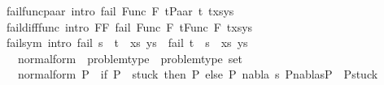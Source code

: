 \begin{isabellebody}
fail{\isacharunderscore}{\kern0pt}func{\isacharunderscore}{\kern0pt}paar\ {\isacharbrackleft}{\kern0pt}intro{\isacharbang}{\kern0pt}{\isacharbrackright}{\kern0pt}{\isacharcolon}{\kern0pt}\ {\isachardoublequoteopen}fail\ {\isacharparenleft}{\kern0pt}Func\ F\ t{\isasymapprox}{\isacharquery}{\kern0pt}Paar\ t{}\ t{}{\isacharhash}{\kern0pt}xs{\isacharcomma}{\kern0pt}ys{\isacharparenright}{\kern0pt}{\isachardoublequoteclose}\ {\isacharbar}{\kern0pt}\isanewline
fail{\isacharunderscore}{\kern0pt}diff{\isacharunderscore}{\kern0pt}func\ {\isacharbrackleft}{\kern0pt}intro{\isacharbang}{\kern0pt}{\isacharbrackright}{\kern0pt}{\isacharcolon}{\kern0pt}\ {\isachardoublequoteopen}{\isasymlbrakk}F{}{\isasymnoteq}F{}{\isasymrbrakk}{\isasymLongrightarrow}\ fail\ {\isacharparenleft}{\kern0pt}Func\ F{}\ t{}{\isasymapprox}{\isacharquery}{\kern0pt}Func\ F{}\ t{}{\isacharhash}{\kern0pt}xs{\isacharcomma}{\kern0pt}ys{\isacharparenright}{\kern0pt}{\isachardoublequoteclose}\ {\isacharbar}{\kern0pt}\isanewline
fail{\isacharunderscore}{\kern0pt}sym\ {\isacharbrackleft}{\kern0pt}intro{\isacharbang}{\kern0pt}{\isacharbrackright}{\kern0pt}{\isacharcolon}{\kern0pt}\ {\isachardoublequoteopen}fail\ {\isacharparenleft}{\kern0pt}s\ {\isasymapprox}{\isacharquery}{\kern0pt}\ t\ {\isacharhash}{\kern0pt}\ xs{\isacharcomma}{\kern0pt}\ ys{\isacharparenright}{\kern0pt}\ {\isasymLongrightarrow}\ fail\ {\isacharparenleft}{\kern0pt}t\ {\isasymapprox}{\isacharquery}{\kern0pt}\ s\ {\isacharhash}{\kern0pt}\ xs{\isacharcomma}{\kern0pt}\ ys{\isacharparenright}{\kern0pt}{\isachardoublequoteclose}\isanewline
\isanewline
\isanewline
\isanewline
\isanewline
{}\isamarkupfalse%
\ \isanewline
\ \ normal{\isacharunderscore}{\kern0pt}form\ {\isacharcolon}{\kern0pt}{\isacharcolon}{\kern0pt}\ {\isachardoublequoteopen}problem{\isacharunderscore}{\kern0pt}type\ {\isasymRightarrow}\ problem{\isacharunderscore}{\kern0pt}type\ set{\isachardoublequoteclose}\ \ \isanewline
\ \ {\isachardoublequoteopen}normal{\isacharunderscore}{\kern0pt}form\ P{}\ {\isasymequiv}\ if\ P{}\ {\isasymin}\ stuck\ then\ {\isacharbraceleft}{\kern0pt}P{}{\isacharbraceright}{\kern0pt}\ else\ {\isacharbraceleft}{\kern0pt}P{}{\isachardot}{\kern0pt}\ {\isasymexists}nabla\ s{\isachardot}{\kern0pt}\ P{}{\isasymTurnstile}{\isacharparenleft}{\kern0pt}nabla{\isacharcomma}{\kern0pt}s{\isacharparenright}{\kern0pt}{\isasymRightarrow}P{}\ {\isasymand}\ P{}{\isasymin}stuck{\isacharbraceright}{\kern0pt}{\isachardoublequoteclose}\isanewline

\end{isabellebody}

